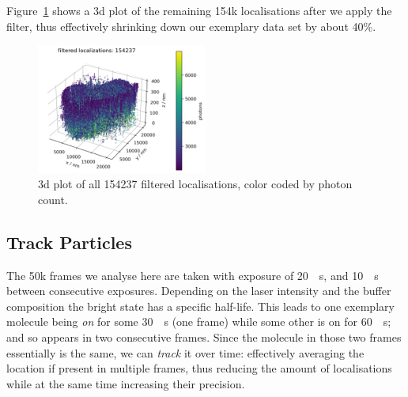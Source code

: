 \documentclass[11pt, a4paper, oneside, twocolumn]{report}
\newcommand{\e}{\emph}
\newcommand{\m}{\mathrm}
\begin{document}
Figure~\ref{f:4_filter} shows a 3d plot of the remaining 154k
localisations after we apply the filter, thus effectively shrinking
down our exemplary data set by about 40\%.

  

\begin{figure}[h!]
  \centering
  \includegraphics[width=0.5\textwidth]{4_filter.png}
  \caption{3d plot of all 154237 filtered localisations, color coded
    by photon count.}
  \label{f:4_filter}
\end{figure}


\subsection{Track Particles}

The 50k frames we analyse here are taken with exposure of
\SI{20}{\m\s}, and \SI{10}{\m\s} between consecutive
exposures. Depending on the laser intensity and the buffer composition
the bright state has a specific half-life. This leads to one exemplary
molecule being \e{on} for some \SI{30}{\m\s} (one frame) while some
other is on for \SI{60}{\m\s}; and so appears in two consecutive
frames. Since the molecule in those two frames essentially is the
same, we can \e{track} it over time: effectively averaging the
location if present in multiple frames, thus reducing the amount of
localisations while at the same time increasing their precision.
\end{document}

